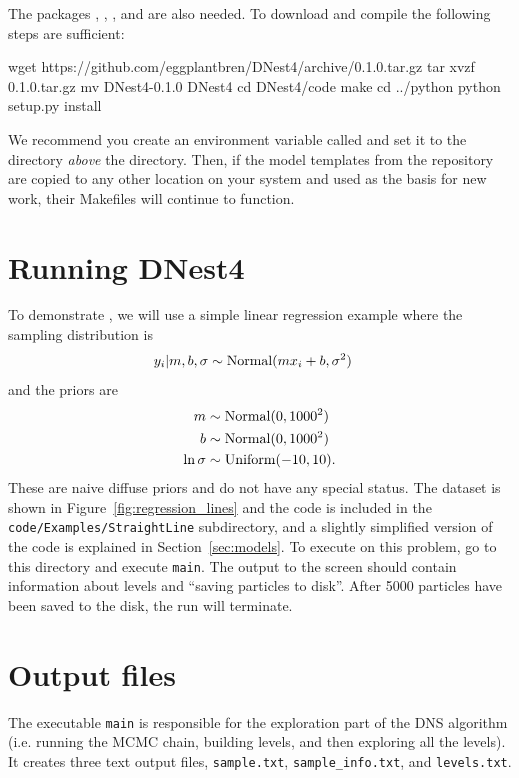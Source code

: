 \documentclass[article, nojss]{jss}
\begin{document}
The 
packages  \citep{numpy},  \citep{matplotlib},
 \citep{pandas}, and  \citep{cython} are also needed.
To download and compile 
the following steps are sufficient:
\begin{CodeChunk}
\begin{CodeInput}
wget https://github.com/eggplantbren/DNest4/archive/0.1.0.tar.gz
tar xvzf 0.1.0.tar.gz
mv DNest4-0.1.0 DNest4
cd DNest4/code
make
cd ../python
python setup.py install
\end{CodeInput}
\end{CodeChunk}

We recommend you create an environment variable called 
and set it to the directory {\em above} the  directory. Then,
if the model templates from the  repository are copied
to any other location on your system and used as the basis for
new work, their Makefiles will continue to function.

\section{Running DNest4}\label{sec:running}
To demonstrate ,
we will use a simple linear regression example where the
sampling distribution is
\begin{align}
y_i | m, b, \sigma &\sim \textnormal{Normal}(mx_i + b, \sigma^2)
\end{align}
and the priors are
\begin{align}
m &\sim \textnormal{Normal}(0, 1000^2)\\
b &\sim \textnormal{Normal}(0, 1000^2)\\
\ln\sigma &\sim \textnormal{Uniform}(-10, 10).
\end{align}
These are naive diffuse priors and do not have any special status.
The dataset is shown in Figure~\ref{fig:regression_lines}
and the code is included in the {\tt code/Examples/StraightLine}
subdirectory, and a slightly simplified version of the
code is explained in Section~\ref{sec:models}.
To execute  on this problem, go to this directory and
execute {\tt main}. The output to the screen
should contain information about levels and ``saving particles to disk''.
After 5000 particles have been saved to the disk, the run will terminate.

\section{Output files}
The executable {\tt main} is responsible for the exploration part of the
DNS algorithm (i.e. running the MCMC chain, building
levels, and then exploring all the levels). It creates three text output files,
{\tt sample.txt}, {\tt sample\_info.txt}, and {\tt levels.txt}.
\end{document}
